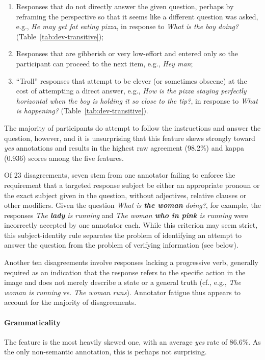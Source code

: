 \begin{enumerate}
\item Responses that do not directly answer the given question, perhaps by reframing the perspective so that it seems like a different question was asked, e.g., \textit{He may get fat eating pizza}, in response to \textit{What is the boy doing?} (Table~\ref{tab:dev-transitive});
\item Responses that are gibberish or very low-effort and entered only so the participant can proceed to the next item, e.g., \textit{Hey man};
\item ``Troll'' responses that attempt to be clever (or sometimes obscene) at the cost of attempting a direct answer, e.g., \textit{How is the pizza staying perfectly horizontal when the boy is holding it so close to the tip?}, in response to \textit{What is happening?} (Table~\ref{tab:dev-transitive}).
\end{enumerate}

The majority of participants do attempt to follow the instructions and answer the question, however, and it is unsurprising that this feature skews strongly toward \textit{yes} annotations and results in the highest raw agreement (98.2\%) and kappa (0.936) scores among the five features.

Of 23 disagreements, seven stem from one annotator failing to enforce the requirement that a targeted response subject be either an appropriate pronoun or the exact subject given in the question, without adjectives, relative clauses or other modifiers. Given the question \textit{What is \textbf{the woman} doing?}, for example, the responses \textit{The \textbf{lady} is running} and \textit{The woman \textbf{who in pink} is running} were incorrectly accepted by one annotator each.  While this criterion may seem strict, this subject-identity rule separates the problem of identifying an attempt to answer the question from the problem of verifying information (see  below).

Another ten disagreements involve responses lacking a progressive verb, generally required as an indication that the response refers to the specific action in the image and does not merely describe a state or a general truth (cf., e.g., \textit{The woman is running} vs. \textit{The woman runs}). Annotator fatigue thus appears to account for the majority of  disagreements.

\paragraph{Grammaticality} The  feature is the most heavily skewed one, with an average \textit{yes} rate of 86.6\%.  As the only non-semantic annotation, this is perhaps not surprising.

